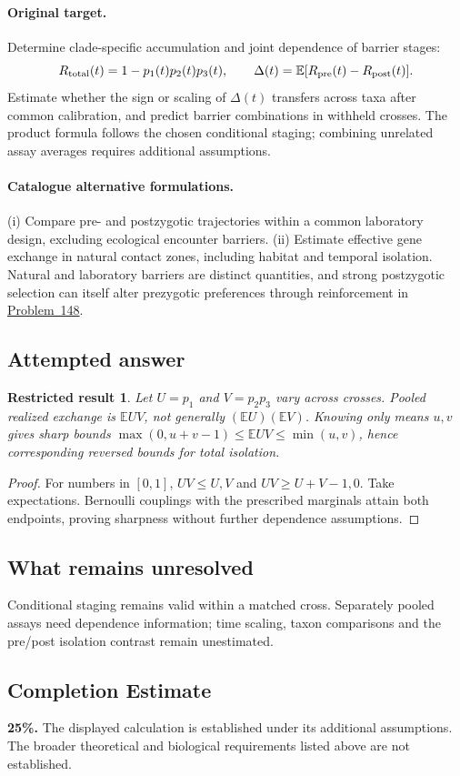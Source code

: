 \documentclass[11pt]{article}
\newcommand{\E}{\mathbb E}
\providecommand{\E}{\mathbb E}
\newtheorem{attemptresult}{Restricted result}[section]
\begin{document}
\paragraph{Original target.}
Determine clade-specific accumulation and joint dependence of barrier stages:
\[
R_{\rm total}(t)=1-p_1(t)p_2(t)p_3(t),
\qquad
\Delta(t)=\E[R_{\rm pre}(t)-R_{\rm post}(t)].
\]
Estimate whether the sign or scaling of $\Delta(t)$ transfers across taxa after common calibration, and predict barrier combinations in withheld crosses. The product formula follows the chosen conditional staging; combining unrelated assay averages requires additional assumptions.
\paragraph{Catalogue alternative formulations.}
(i) Compare pre- and postzygotic trajectories within a common laboratory design, excluding ecological encounter barriers. (ii) Estimate effective gene exchange in natural contact zones, including habitat and temporal isolation. Natural and laboratory barriers are distinct quantities, and strong postzygotic selection can itself alter prezygotic preferences through reinforcement in \href{https://we-solve.github.io/problems/reinforcement-a220f596/}{Problem~148}.
\subsection{Attempted answer}
\begin{attemptresult}
Let $U=p_1$ and $V=p_2p_3$ vary across crosses. Pooled realized exchange is $\E UV$, not generally $(\E U)(\E V)$. Knowing only means $u,v$ gives sharp bounds $\max(0,u+v-1)\leq\E UV\leq\min(u,v)$, hence corresponding reversed bounds for total isolation.
\end{attemptresult}
\begin{proof}
For numbers in $[0,1]$, $UV\leq U,V$ and $UV\geq U+V-1,0$. Take expectations. Bernoulli couplings with the prescribed marginals attain both endpoints, proving sharpness without further dependence assumptions.
\end{proof}
\subsection{What remains unresolved}
Conditional staging remains valid within a matched cross. Separately pooled assays need dependence information; time scaling, taxon comparisons and the pre/post isolation contrast remain unestimated.
\subsection{Completion Estimate}
\textbf{25\%.} The displayed calculation is established under its additional assumptions. The broader theoretical and biological requirements listed above are not established.
\end{document}
